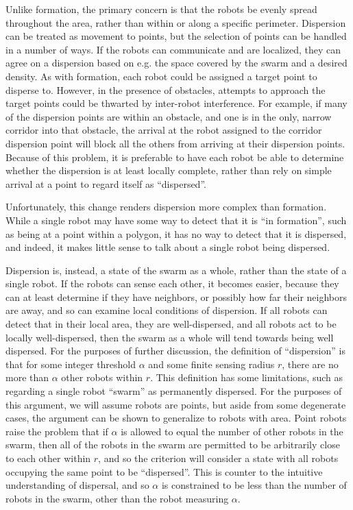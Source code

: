 Unlike formation, the primary concern is that the robots be evenly spread throughout the area, rather than within or along a specific perimeter. 
Dispersion can be treated as movement to points, but the selection of points can be handled in a number of ways. 
If the robots can communicate and are localized, they can agree on a dispersion based on e.g. the space covered by the swarm and a desired density. 
As with formation, each robot could be assigned a target point to disperse to.
However, in the presence of obstacles, attempts to approach the target points could be thwarted by inter-robot interference. 
For example, if many of the dispersion points are within an obstacle, and one is in the only, narrow corridor into that obstacle, the arrival at the robot assigned to the corridor dispersion point will block all the others from arriving at their dispersion points. 
Because of this problem, it is preferable to have each robot be able to determine whether the dispersion is at least locally complete, rather than rely on simple arrival at a point to regard itself as ``dispersed''.

Unfortunately, this change renders dispersion more complex than formation. 
While a single robot may have some way to detect that it is ``in formation'', such as being at a point within a polygon, it has no way to detect that it is dispersed, and indeed, it makes little sense to talk about a single robot being dispersed. 

Dispersion is, instead, a state of the swarm as a whole, rather than the state of a single robot. 
If the robots can sense each other, it becomes easier, because they can at least determine if they have neighbors, or possibly how far their neighbors are away, and so can examine local conditions of dispersion. If all robots can detect that in their local area, they are well-dispersed, and all robots act to be locally well-dispersed, then the swarm as a whole will tend towards being well dispersed. 
For the purposes of further discussion, the definition of ``dispersion'' is that for some integer threshold $\alpha$ and some finite sensing radius $r$, there are no more than $\alpha$ other robots within $r$. 
This definition has some limitations, such as regarding a single robot ``swarm'' as permanently dispersed. 
For the purposes of this argument, we will assume robots are points, but aside from some degenerate cases, the argument can be shown to generalize to robots with area. 
Point robots raise the problem that if $\alpha$ is allowed to equal the number of other robots in the swarm, then all of the robots in the swarm are permitted to be arbitrarily close to each other within $r$, and so the criterion will consider a state with all robots occupying the same point to be ``dispersed''. 
This is counter to the intuitive understanding of dispersal, and so $\alpha$ is constrained to be less than the number of robots in the swarm, other than the robot measuring $\alpha$. 

